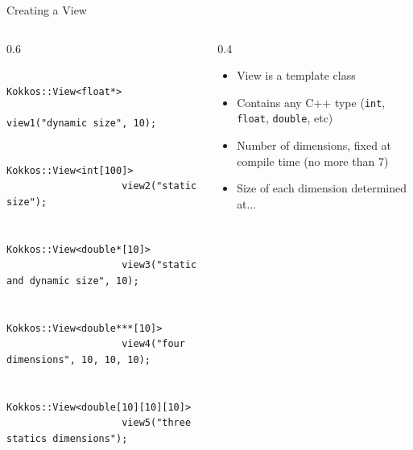 \documentclass[
    aspectratio=169,
    \createHandout
]{beamer}
\begin{document}
\begin{frame}[fragile]{Creating a View}
    \begin{columns}
        \begin{column}{0.6\linewidth}
            \begin{verbatim}
                Kokkos::View<float*>
                    view1("dynamic size", 10);

                Kokkos::View<int[100]>
                    view2("static size");

                Kokkos::View<double*[10]>
                    view3("static and dynamic size", 10);

                Kokkos::View<double***[10]>
                    view4("four dimensions", 10, 10, 10);

                Kokkos::View<double[10][10][10]>
                    view5("three statics dimensions");
            \end{verbatim}
        \end{column}
        \begin{column}{0.4\linewidth}
            \begin{itemize}
                \item View is a template class
                \item Contains any C++ type (\texttt{int}, \texttt{float}, \texttt{double}, etc)
                \item Number of dimensions, fixed at compile time (no more than 7)
                \item Size of each dimension determined at...
            \end{itemize}
        \end{column}
    \end{columns}
\end{frame}

\end{document}
